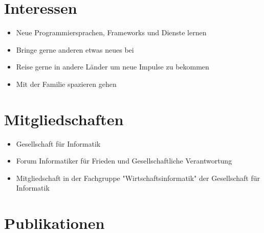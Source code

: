 \documentclass[a4paper]{friggeri-cv} %
\begin{document}

\section{Interessen}
\begin{itemize}
  \item Neue Programmiersprachen, Frameworks und Dienste lernen
  \item Bringe gerne anderen etwas neues bei
  \item Reise gerne in andere Länder um neue Impulse zu bekommen
  \item Mit der Familie spazieren gehen  
\end{itemize}

\section{Mitgliedschaften}
\begin{itemize}
	\item Gesellschaft für Informatik
	\item Forum Informatiker für Frieden und Gesellschaftliche Verantwortung
	\item Mitgliedschaft in der Fachgruppe "Wirtschaftsinformatik" der Gesellschaft für Informatik
\end{itemize}

\newpage
\section{Publikationen}



\end{document}
